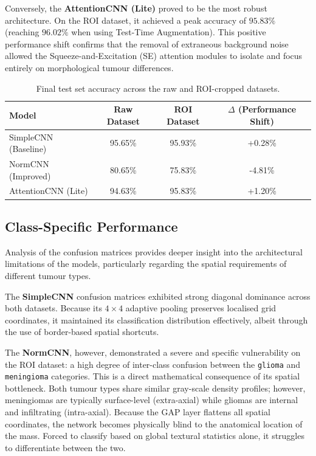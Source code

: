 \documentclass{article}
\begin{document}
Conversely, the \textbf{AttentionCNN (Lite)} proved to be the most robust architecture. On the ROI dataset, it achieved a peak accuracy of $95.83\%$ (reaching $96.02\%$ when using Test-Time Augmentation). This positive performance shift confirms that the removal of extraneous background noise allowed the Squeeze-and-Excitation (SE) attention modules to isolate and focus entirely on morphological tumour differences.

\begin{table}[H]
\centering
\caption{Final test set accuracy across the raw and ROI-cropped datasets.}
\label{tab:results_summary}
\begin{tabular}{lccc}
\toprule
\textbf{Model} & \textbf{Raw Dataset} & \textbf{ROI Dataset} & \textbf{$\Delta$ (Performance Shift)} \\
\midrule
SimpleCNN (Baseline) & 95.65\% & 95.93\% & +0.28\% \\
NormCNN (Improved)   & 80.65\% & 75.83\% & -4.81\% \\
AttentionCNN (Lite)  & 94.63\% & 95.83\% & +1.20\% \\
\bottomrule
\end{tabular}
\end{table}

\subsection{Class-Specific Performance}

Analysis of the confusion matrices provides deeper insight into the architectural limitations of the models, particularly regarding the spatial requirements of different tumour types.

The \textbf{SimpleCNN} confusion matrices exhibited strong diagonal dominance across both datasets. Because its $4 \times 4$ adaptive pooling preserves localised grid coordinates, it maintained its classification distribution effectively, albeit through the use of border-based spatial shortcuts.

The \textbf{NormCNN}, however, demonstrated a severe and specific vulnerability on the ROI dataset: a high degree of inter-class confusion between the \texttt{glioma} and \texttt{meningioma} categories. This is a direct mathematical consequence of its spatial bottleneck. Both tumour types share similar gray-scale density profiles; however, meningiomas are typically surface-level (extra-axial) while gliomas are internal and infiltrating (intra-axial). Because the GAP layer flattens all spatial coordinates, the network becomes physically blind to the anatomical location of the mass. Forced to classify based on global textural statistics alone, it struggles to differentiate between the two.
\end{document}
